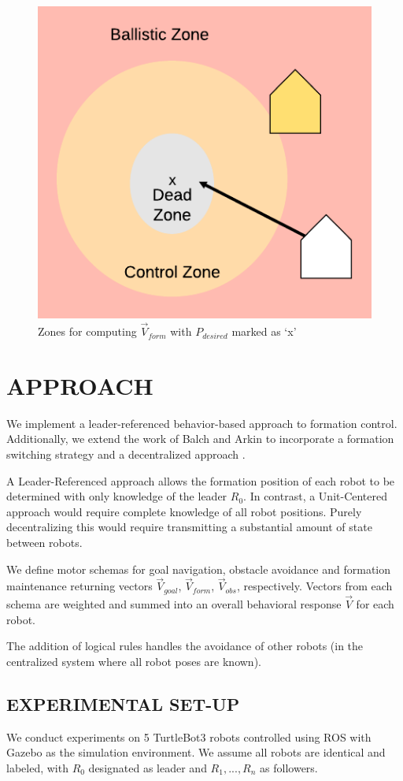 \documentclass[letterpaper, 10 pt, conference]{ieeeconf}  %
\begin{document}
\begin{figure}[ht]
\centering
\includegraphics[width=0.45\linewidth]{images/formation_zones.png}
\caption{Zones for computing $\vec{V}_{form}$ with $P_{desired}$ marked as `x'}
\label{formation_zones}
\end{figure}

\section{APPROACH}

We implement a leader-referenced behavior-based approach to formation control. Additionally, we extend the work of Balch and Arkin to incorporate a formation switching strategy and a decentralized approach \cite{repository}.

A Leader-Referenced approach allows the formation position of each robot to be determined with only knowledge of the leader $R_0$. 
In contrast, a Unit-Centered approach would require complete knowledge of all robot positions. Purely decentralizing this would require transmitting a substantial amount of state between robots.

We define motor schemas for goal navigation, obstacle avoidance and formation maintenance returning vectors $\vec{V}_{goal}$, $\vec{V}_{form}$, $\vec{V}_{obs}$, respectively. Vectors from each schema are weighted and summed into an overall behavioral response $\vec{V}$ for each robot.

The addition of logical rules handles the avoidance of other robots (in the centralized system where all robot poses are known).

\subsection{EXPERIMENTAL SET-UP}

We conduct experiments on 5 TurtleBot3 \cite{turtlebot} robots controlled using ROS \cite{ros} with Gazebo \cite{gazebo} as the simulation environment. We assume all robots are identical and labeled, with $R_0$ designated as leader and $R_1,...,R_n$ as followers. 
\end{document}
